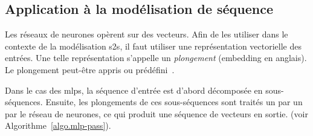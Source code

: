 \subsection{Application à la modélisation de séquence}

Les réseaux de neurones opèrent sur des vecteurs.
Afin de les utiliser dans le contexte de la modélisation \gls{s2s}, 
il faut utiliser une représentation vectorielle des entrées.
Une telle représentation s'appelle un \emph{plongement} (\foreignlanguage{english}{embedding} en anglais).
Le plongement peut-être appris ou prédéfini~\cite{Raschka_Mirjalili_2017}.

Dans le cas des \glspl{mlp}, la séquence d'entrée est d'abord décomposée en sous-séquences.
Ensuite, les plongements de ces sous-séquences sont traités un par un par le réseau de neurones,
ce qui produit une séquence de vecteurs en sortie.
(voir Algorithme~\ref{algo.mlp-pass}).



